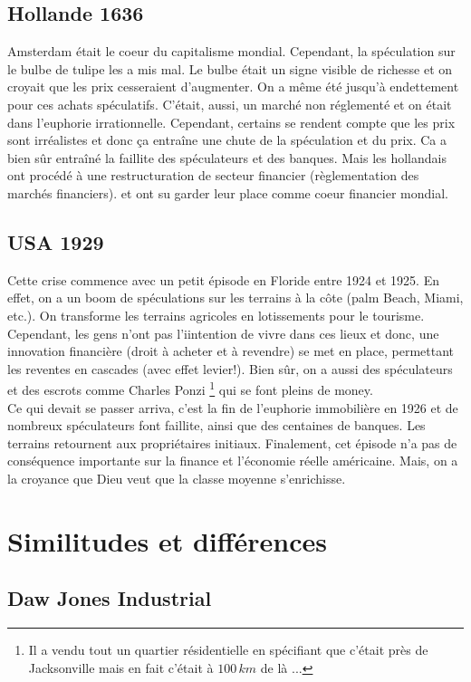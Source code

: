 \subsection{Hollande 1636}
Amsterdam était le coeur du capitalisme mondial. Cependant, la spéculation sur le bulbe de tulipe les a mis mal. Le bulbe était un signe visible de richesse et on croyait que les prix cesseraient d’augmenter. On a même été jusqu'à endettement pour ces achats spéculatifs. C'était, aussi, un marché non réglementé et on était dans l'euphorie irrationnelle. Cependant, certains se rendent compte que les prix sont irréalistes et donc ça entraîne une chute de la spéculation et du prix. Ca a bien sûr entraîné la faillite des spéculateurs et des banques. Mais les hollandais ont procédé à une restructuration de secteur financier (règlementation des marchés financiers). et ont su garder leur place comme coeur financier mondial.

\subsection{USA 1929}
Cette crise commence avec un petit épisode en Floride entre 1924 et 1925. En effet, on a un boom de spéculations sur les terrains à la côte (palm Beach, Miami, etc.). On transforme les terrains agricoles en lotissements pour le tourisme. Cependant, les gens n'ont pas l'iintention de vivre dans ces lieux et donc, une innovation financière (droit à acheter et à revendre) se met en place, permettant les reventes en cascades (avec effet levier!). Bien sûr, on a aussi des spéculateurs et des escrots comme Charles Ponzi \footnote{Il a vendu tout un quartier résidentielle en spécifiant que c'était près de Jacksonville mais en fait c'était à $100\, km$ de là ...} qui se font pleins de money. \\
Ce qui devait se passer arriva, c'est la fin de l'euphorie immobilière en 1926 et de nombreux spéculateurs font faillite, ainsi que des centaines de banques. Les terrains retournent aux propriétaires initiaux. Finalement, cet épisode n'a pas de conséquence importante sur la finance et l'économie réelle américaine. Mais, on a la croyance que Dieu veut que la classe moyenne s'enrichisse.

\section{Similitudes et différences}
\subsection{Daw Jones Industrial}

